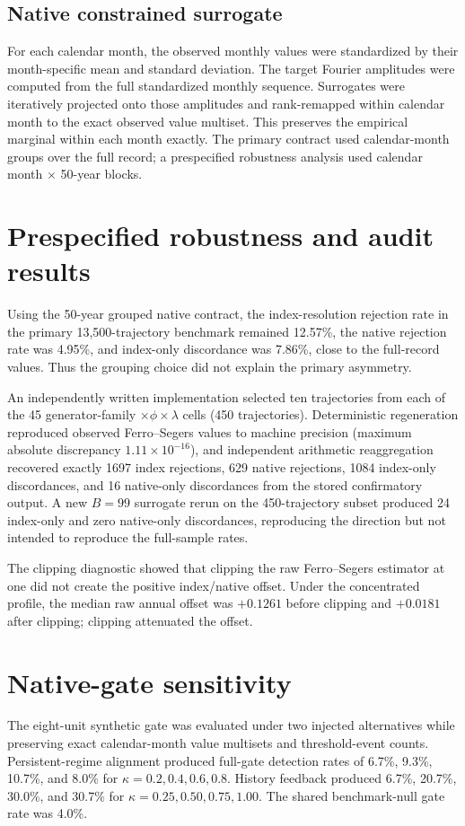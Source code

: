 \documentclass[11pt]{article}
\begin{document}
\subsection{Native constrained surrogate}
For each calendar month, the observed monthly values were standardized by their month-specific mean and standard deviation. The target Fourier amplitudes were computed from the full standardized monthly sequence. Surrogates were iteratively projected onto those amplitudes and rank-remapped within calendar month to the exact observed value multiset. This preserves the empirical marginal within each month exactly. The primary contract used calendar-month groups over the full record; a prespecified robustness analysis used calendar month $\times$ 50-year blocks.

\section{Prespecified robustness and audit results}
Using the 50-year grouped native contract, the index-resolution rejection rate in the primary 13,500-trajectory benchmark remained 12.57\%, the native rejection rate was 4.95\%, and index-only discordance was 7.86\%, close to the full-record values. Thus the grouping choice did not explain the primary asymmetry.

An independently written implementation selected ten trajectories from each of the 45 generator-family $\times\phi\times\lambda$ cells (450 trajectories). Deterministic regeneration reproduced observed Ferro--Segers values to machine precision (maximum absolute discrepancy $1.11\times10^{-16}$), and independent arithmetic reaggregation recovered exactly 1697 index rejections, 629 native rejections, 1084 index-only discordances, and 16 native-only discordances from the stored confirmatory output. A new $B=99$ surrogate rerun on the 450-trajectory subset produced 24 index-only and zero native-only discordances, reproducing the direction but not intended to reproduce the full-sample rates.

The clipping diagnostic showed that clipping the raw Ferro--Segers estimator at one did not create the positive index/native offset. Under the concentrated profile, the median raw annual offset was $+0.1261$ before clipping and $+0.0181$ after clipping; clipping attenuated the offset.

\section{Native-gate sensitivity}
The eight-unit synthetic gate was evaluated under two injected alternatives while preserving exact calendar-month value multisets and threshold-event counts. Persistent-regime alignment produced full-gate detection rates of 6.7\%, 9.3\%, 10.7\%, and 8.0\% for $\kappa=0.2,0.4,0.6,0.8$. History feedback produced 6.7\%, 20.7\%, 30.0\%, and 30.7\% for $\kappa=0.25,0.50,0.75,1.00$. The shared benchmark-null gate rate was 4.0\%.
\end{document}
